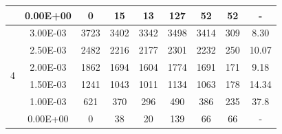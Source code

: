 \begin{table}[H]
{\begin{tabular}{|c|c|c|c|c|c|c|c|c|}
                               & 0.00E+00         & 0         & 15                                                         & 13                                                        & 127                                                       & 52      & 52     & -                                                                  \\ \hline
            \multirow{6}{*}{4} & 3.00E-03         & 3723      & 3402                                                       & 3342                                                      & 3498                                                      & 3414    & 309    & 8.30                                                               \\ \cline{2-9}
                               & 2.50E-03         & 2482      & 2216                                                       & 2177                                                      & 2301                                                      & 2232    & 250    & 10.07                                                              \\ \cline{2-9}
                               & 2.00E-03         & 1862      & 1694                                                       & 1604                                                      & 1774                                                      & 1691    & 171    & 9.18                                                               \\ \cline{2-9}
                               & 1.50E-03         & 1241      & 1043                                                       & 1011                                                      & 1134                                                      & 1063    & 178    & 14.34                                                              \\ \cline{2-9}
                               & 1.00E-03         & 621       & 370                                                        & 296                                                       & 490                                                       & 386     & 235    & 37.8                                                               \\ \cline{2-9}
                               & 0.00E+00         & 0         & 38                                                         & 20                                                        & 139                                                       & 66      & 66     & -                                                                  \\ \hline

\end{tabular}}
\end{table}
